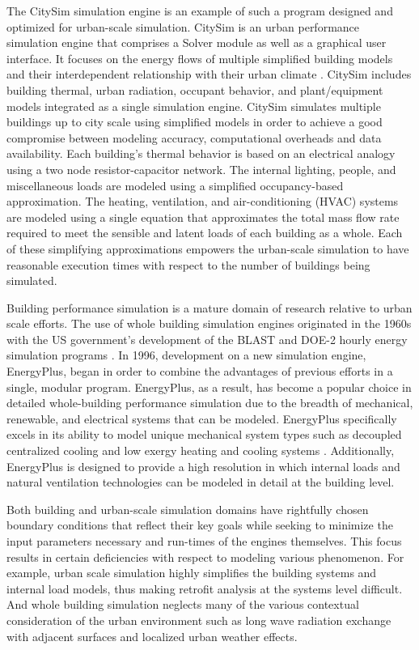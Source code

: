 \documentclass{tBPS2e}
\theoremstyle{plain}
\theoremstyle{definition}
\theoremstyle{remark}
\begin{document}
The CitySim simulation engine is an example of such a program designed and optimized for urban-scale simulation. CitySim is an urban performance simulation engine that comprises a Solver module as well as a graphical user interface. It focuses on the energy flows of multiple simplified building models and their interdependent relationship with their urban climate \citep{Robinson:2009tm}. CitySim includes building thermal, urban radiation, occupant behavior, and plant/equipment models integrated as a single simulation engine. CitySim simulates multiple buildings up to city scale using simplified models in order to achieve a good compromise between modeling accuracy, computational overheads and data availability. Each building's thermal behavior is based on an electrical analogy using a two node resistor-capacitor network. The internal lighting, people, and miscellaneous loads are modeled using a simplified occupancy-based approximation. The heating, ventilation, and air-conditioning (HVAC) systems are modeled using a single equation that approximates the total mass flow rate required to meet the sensible and latent loads of each building as a whole. Each of these simplifying approximations empowers the urban-scale simulation to have reasonable execution times with respect to the number of buildings being simulated.

Building performance simulation is a mature domain of research relative to urban scale efforts. The use of whole building simulation engines originated in the 1960s with the US government's development of the BLAST and DOE-2 hourly energy simulation programs \citep{Lawrie:2001vf}. In 1996, development on a new simulation engine, EnergyPlus, began in order to combine the advantages of previous efforts in a single, modular program. EnergyPlus, as a result, has become a popular choice in detailed whole-building performance simulation due to the breadth of mechanical, renewable, and electrical systems that can be modeled. EnergyPlus specifically excels in its ability to model unique mechanical system types such as decoupled centralized cooling \citep{Miller:2010wa} and low exergy heating and cooling systems \citep{barbara:2015tz}. Additionally, EnergyPlus is designed to provide a high resolution in which internal loads and natural ventilation technologies can be modeled in detail at the building level.  

Both building and urban-scale simulation domains have rightfully chosen boundary conditions that reflect their key goals while seeking to minimize the input parameters necessary and run-times of the engines themselves. This focus results in certain deficiencies with respect to modeling various phenomenon. For example, urban scale simulation highly simplifies the building systems and internal load models, thus making retrofit analysis at the systems level difficult. And whole building simulation neglects many of the various contextual consideration of the urban environment such as long wave radiation exchange with adjacent surfaces and localized urban weather effects.
\end{document}
